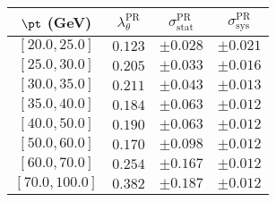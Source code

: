 \begin{tabular}{c||c||c|c}
$\pt$ (GeV) & $\lambda_\theta^{\text{PR}}$ & $\sigma_{\text{stat}}^{\text{PR}}$ & $\sigma_{\text{sys}}^{\text{PR}}$  \\
\hline
$[20.0, 25.0]$& $0.123$ & $\pm0.028$ & $\pm0.021$\\
$[25.0, 30.0]$& $0.205$ & $\pm0.033$ & $\pm0.016$\\
$[30.0, 35.0]$& $0.211$ & $\pm0.043$ & $\pm0.013$\\
$[35.0, 40.0]$& $0.184$ & $\pm0.063$ & $\pm0.012$\\
$[40.0, 50.0]$& $0.190$ & $\pm0.063$ & $\pm0.012$\\
$[50.0, 60.0]$& $0.170$ & $\pm0.098$ & $\pm0.012$\\
$[60.0, 70.0]$& $0.254$ & $\pm0.167$ & $\pm0.012$\\
$[70.0, 100.0]$& $0.382$ & $\pm0.187$ & $\pm0.012$\\
\end{tabular}
